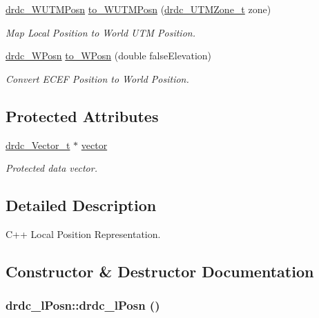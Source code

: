 \begin{CompactItemize}
\hyperlink{classdrdc__WUTMPosn}{drdc\_\-WUTMPosn} \hyperlink{classdrdc__lPosn_243a0513a9126c8e171953e663bdb213}{to\_\-WUTMPosn} (\hyperlink{structdrdc__UTMZone__t}{drdc\_\-UTMZone\_\-t} zone)
\begin{CompactList}\small\item\em Map Local Position to World UTM Position. \item\end{CompactList}\item 
\hyperlink{classdrdc__WPosn}{drdc\_\-WPosn} \hyperlink{classdrdc__lPosn_6abd4aad19a2f3323e36ce16800a5d3e}{to\_\-WPosn} (double falseElevation)
\begin{CompactList}\small\item\em Convert ECEF Position to World Position. \item\end{CompactList}\end{CompactItemize}
\subsection*{Protected Attributes}
\begin{CompactItemize}
\item 
\hyperlink{structdrdc__Vector__t}{drdc\_\-Vector\_\-t} $\ast$ \hyperlink{classdrdc__lPosn_91f12f937fa99f51bc221c237f47b63f}{vector}
\begin{CompactList}\small\item\em Protected data vector. \item\end{CompactList}\end{CompactItemize}


\subsection{Detailed Description}
C++ Local Position Representation. 



\subsection{Constructor \& Destructor Documentation}
\hypertarget{classdrdc__lPosn_39ab1367388ed6f655a1fec657e2fd20}{
\subsubsection[drdc\_\-lPosn]{\setlength{\rightskip}{0pt plus 5cm}drdc\_\-lPosn::drdc\_\-lPosn ()}}
\label{classdrdc__lPosn_39ab1367388ed6f655a1fec657e2fd20}


